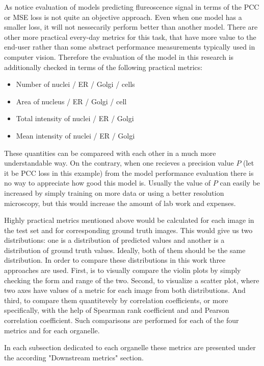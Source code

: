 
As \cite{Lachance_2020} notice evaluation of models predicting flureoscence signal in terms of the PCC or MSE loss is not quite an objective approach. Even when one model has a smaller loss, it will not nessecarily perform better than another model. There are other more practical every-day metrics for this task, that have more value to the end-user rather than some abstract performance measurements typically used in computer vision. Therefore the evaluation of the model in this research is additionally checked in terms of the following practical metrics:
\begin{itemize}
    \item Number of nuclei / ER / Golgi / cells
    \item Area of nucleus / ER / Golgi / cell
    \item Total intensity of nuclei / ER / Golgi
    \item Mean intensity of nuclei / ER / Golgi
\end{itemize}

These quantities can be compareed with each other in a much more understandable way. On the contrary, when one recieves a precision value $P$ (let it be PCC loss in this example) from the model performance evaluation there is no way to appreciate how good this model is. Usually the value of $P$ can easily be increased by simply training on more data or using a better resolution microscopy, but this would increase the amount of lab work and expenses.

Highly practical metrics mentioned above would be calculated for each image in the test set and for corresponding ground truth images. This would give us two distributions: one is a distribution of predicted values and another is a distribution of ground truth values. Ideally, both of them should be the same distribution. In order to compare these distributions in this work three approaches are used. First, is to visually compare the violin plots by simply checking the form and range of the two. Second, to visualize a scatter plot, where two axes have values of a metric for each image from both distributions. And third, to compare them quantitevely by correlation coefficients, or more specifically, with the help of Spearman rank coefficient and and Pearson correlation coefficient. Such comparisons are performed for each of the four metrics and for each organelle.

In each subsection dedicated to each organelle these metrics are presented under the according "Downstream metrics" section.